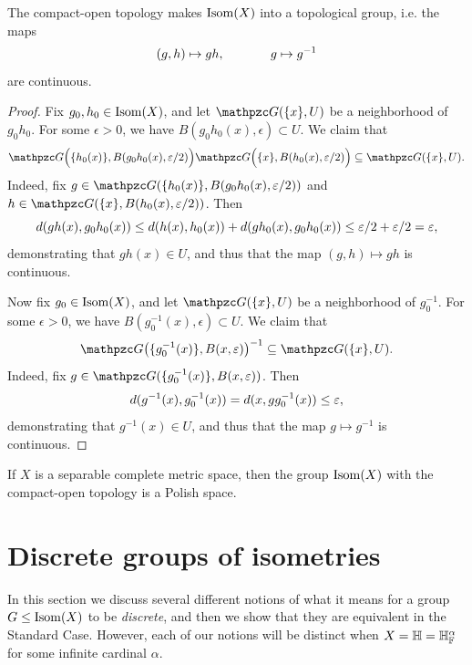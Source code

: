\begin{proposition}
The compact-open topology makes $\operatorname{Isom}(X)$ into a topological group, i.e. the maps
\[
(g,h) \mapsto gh, \hspace{.5 in}
g \mapsto g^{-1}
\]
are continuous.
\end{proposition}
\begin{proof}
Fix $g_0,h_0\in\operatorname{Isom}(X)$, and let $\GG(\{x\},U)$ be a neighborhood of $g_0 h_0$. For some $\epsilon > 0$, we have $B(g_0 h_0(x),\epsilon)\subset U$. We claim that
\[
\GG\Big(\{h_0(x)\},B(g_0 h_0(x),\epsilon/2)\Big) \GG\Big(\{x\},B(h_0(x),\epsilon/2)\Big) \subset \GG(\{x\},U).
\]
Indeed, fix $g\in \GG(\{h_0(x)\},B(g_0 h_0(x),\epsilon/2))$ and $h\in \GG(\{x\},B(h_0(x),\epsilon/2))$. Then
\[
d(gh(x),g_0 h_0(x)) \leq d(h(x),h_0(x)) + d(gh_0(x),g_0 h_0(x)) \leq \varepsilon/2 + \varepsilon/2 = \varepsilon,
\]
demonstrating that $gh(x)\in U$, and thus that the map $(g,h) \mapsto gh$ is continuous.

Now fix $g_0\in\operatorname{Isom}(X)$, and let $\GG(\{x\},U)$ be a neighborhood of $g_0^{-1}$. For some $\epsilon > 0$, we have $B(g_0^{-1}(x),\epsilon)\subset U$. We claim that
\[
\GG\big(\{g_0^{-1}(x)\},B(x,\epsilon)\big)^{-1} \subset \GG(\{x\},U).
\]
Indeed, fix $g\in \GG(\{g_0^{-1}(x)\},B(x,\epsilon))$. Then
\[
d(g^{-1}(x),g_0^{-1}(x)) = d(x,g g_0^{-1}(x)) \leq \varepsilon,
\]
demonstrating that $g^{-1}(x)\in U$, and thus that the map $g \mapsto g^{-1}$ is continuous.
\end{proof}

\begin{remark}
\label{remarkpolish}
If $X$ is a separable complete metric space, then the group $\operatorname{Isom}(X)$ with the compact-open topology is a Polish space.
\end{remark}


\bigskip
\section{Discrete groups of isometries}
\label{subsectiondiscrete}

In this section we discuss several different notions of what it means for a group $G\leq\operatorname{Isom}(X)$ to be \emph{discrete}, and then we show that they are equivalent in the Standard Case. However, each of our notions will be distinct when $X = \H = \H_\F^\alpha$ for some infinite cardinal $\alpha$.

